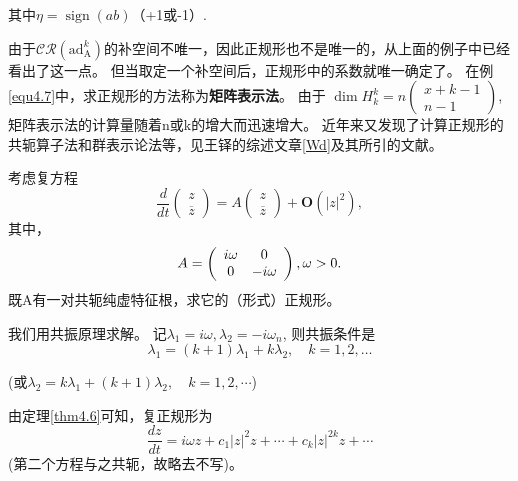 其中$\eta = \operatorname { sign } ( a b )$（+1或-1）.

\begin{corollary}
  由于$\mathscr { C R } \left( \mathrm { ad } _ { \mathrm { A } } ^ { k } \right)$的补空间不唯一，因此正规形也不是唯一的，从上面的例子中已经看出了这一点。
  但当取定一个补空间后，正规形中的系数就唯一确定了。
  在例\ref{equ4.7}中，求正规形的方法称为\textbf{矩阵表示法}。
  由于
  $
  \operatorname { dim } H _ { k } ^ { k }
  = n  \left(
    \begin{array}
      { c } { x + k - 1 } \\
      { n - 1 }
    \end{array}
  \right)
  $,矩阵表示法的计算量随着n或k的增大而迅速增大。
  近年来又发现了计算正规形的共轭算子法和群表示论法等，见王铎的综述文章\ref{Wd}及其所引的文献。
\end{corollary}


\begin{example}
  考虑复方程
  \[
    \frac { d } { d t }
    \left(
      \begin{array} { l }
        { z } \\
        { \overline{z} }
      \end{array}
    \right)
    =    A \left(
      \begin{array} { l }
        { z } \\
        { \overline{z} }
      \end{array}
    \right)
  +\mathbf{O}\left(|z|^2\right),
\]
其中，
\[
  A = \left(
    \begin{array} { c c }
      { i \omega } & { 0 } \\
      { 0 } & { - i \omega }
    \end{array}
  \right),
  \omega > 0.
\]
既A有一对共轭纯虚特征根，求它的（形式）正规形。
\end{example}

\begin{solve}
  我们用共振原理求解。
  记$\lambda _ { 1 } = i \omega , \lambda _ { 2 } = - i \omega _ { n }$,
  则共振条件是
  \[
\lambda _ { 1 } = ( k + 1 ) \lambda _ { 1 } + k \lambda _ { 2 } , \quad k = 1,2 , \dots
\]

\begin{center}
(或$\lambda _ { 2 } = k \lambda _ { 1 } + ( k + 1 ) \lambda _ { 2 } , \quad k = 1,2 , \cdots$)
\end{center}
由定理\ref{thm4.6}可知，复正规形为
\begin{equation}
\frac { d z } { d t } = i \omega z + c _ { 1 } | z | ^ { 2 } z + \cdots + c _ { k } | z | ^ { 2k } z + \cdots
  \label{eq:1.4.22}
\end{equation}
(第二个方程与之共轭，故略去不写)。
\end{solve}

